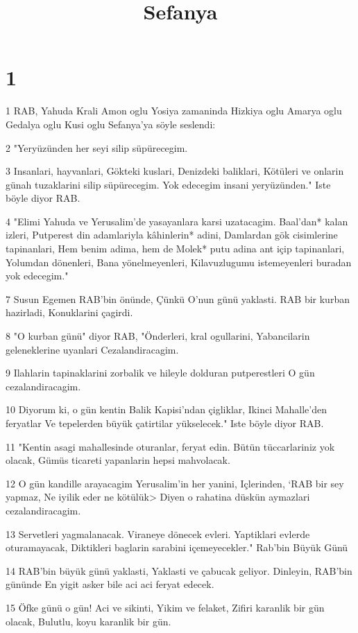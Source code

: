 

\title{Sefanya}


\chapter{1}

\par 1 RAB, Yahuda Krali Amon oglu Yosiya zamaninda Hizkiya oglu Amarya oglu Gedalya oglu Kusi oglu Sefanya'ya söyle seslendi:
\par 2 "Yeryüzünden her seyi silip süpürecegim.
\par 3 Insanlari, hayvanlari, Gökteki kuslari, Denizdeki baliklari, Kötüleri ve onlarin günah tuzaklarini silip süpürecegim. Yok edecegim insani yeryüzünden." Iste böyle diyor RAB.
\par 4 "Elimi Yahuda ve Yerusalim'de yasayanlara karsi uzatacagim. Baal'dan* kalan izleri, Putperest din adamlariyla kâhinlerin* adini, Damlardan gök cisimlerine tapinanlari, Hem benim adima, hem de Molek* putu adina ant içip tapinanlari, Yolumdan dönenleri, Bana yönelmeyenleri, Kilavuzlugumu istemeyenleri buradan yok edecegim."
\par 7 Susun Egemen RAB'bin önünde, Çünkü O'nun günü yaklasti. RAB bir kurban hazirladi, Konuklarini çagirdi.
\par 8 "O kurban günü" diyor RAB, "Önderleri, kral ogullarini, Yabancilarin geleneklerine uyanlari Cezalandiracagim.
\par 9 Ilahlarin tapinaklarini zorbalik ve hileyle dolduran putperestleri O gün cezalandiracagim.
\par 10 Diyorum ki, o gün kentin Balik Kapisi'ndan çigliklar, Ikinci Mahalle'den feryatlar Ve tepelerden büyük çatirtilar yükselecek." Iste böyle diyor RAB.
\par 11 "Kentin asagi mahallesinde oturanlar, feryat edin. Bütün tüccarlariniz yok olacak, Gümüs ticareti yapanlarin hepsi mahvolacak.
\par 12 O gün kandille arayacagim Yerusalim'in her yanini, Içlerinden, `RAB bir sey yapmaz, Ne iyilik eder ne kötülük> Diyen o rahatina düskün aymazlari cezalandiracagim.
\par 13 Servetleri yagmalanacak. Viraneye dönecek evleri. Yaptiklari evlerde oturamayacak, Diktikleri baglarin sarabini içemeyecekler." Rab'bin Büyük Günü
\par 14 RAB'bin büyük günü yaklasti, Yaklasti ve çabucak geliyor. Dinleyin, RAB'bin gününde En yigit asker bile aci aci feryat edecek.
\par 15 Öfke günü o gün! Aci ve sikinti, Yikim ve felaket, Zifiri karanlik bir gün olacak, Bulutlu, koyu karanlik bir gün.
